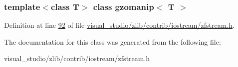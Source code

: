 \subsubsection*{template$<$class T$>$\newline
class gzomanip$<$ T $>$}



Definition at line \hyperlink{visual__studio_2zlib_2contrib_2iostream_2zfstream_8h_source_l00092}{92} of file \hyperlink{visual__studio_2zlib_2contrib_2iostream_2zfstream_8h_source}{visual\+\_\+studio/zlib/contrib/iostream/zfstream.\+h}.



The documentation for this class was generated from the following file\+:\begin{DoxyCompactItemize}
\item 
visual\+\_\+studio/zlib/contrib/iostream/zfstream.\+h\end{DoxyCompactItemize}
